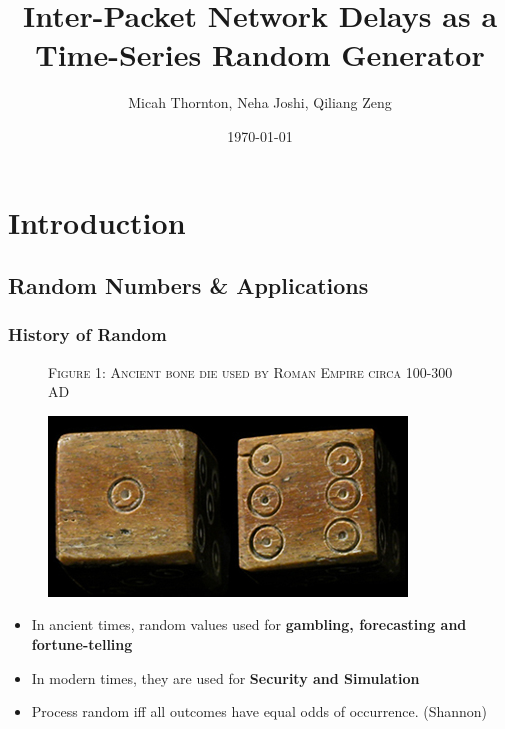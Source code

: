 \documentclass{beamer}
\title{Inter-Packet Network Delays as a Time-Series Random Generator}
\author{Micah Thornton, Neha Joshi, Qiliang Zeng}
\date{\today}
\begin{document}
\begin{frame}
\maketitle{}
\end{frame}

\section{Introduction}

\begin{frame}
\tableofcontents{}
\end{frame}
\begin{frame}
\end{frame}


\subsection{Random Numbers \& Applications}

\begin{frame}
\frametitle{History of Random}

\begin{figure}
\vspace{- 1 em}
{\tiny \textsc{Figure 1: Ancient bone die used by Roman Empire circa 100-300 AD}}

\begin{center}
\includegraphics[scale=0.45]{images/ufdie.jpg} %

\end{center}
\end{figure}

\vspace{- 1.5 em}
\begin{itemize}
		\item In ancient times, random values used for \textbf{gambling,  forecasting and fortune-telling}
		\item In modern times, they are used for \textbf{Security and Simulation}
		\item Process random iff all outcomes have equal odds of occurrence. (Shannon)
\end{itemize}
\end{frame}
\end{document}
